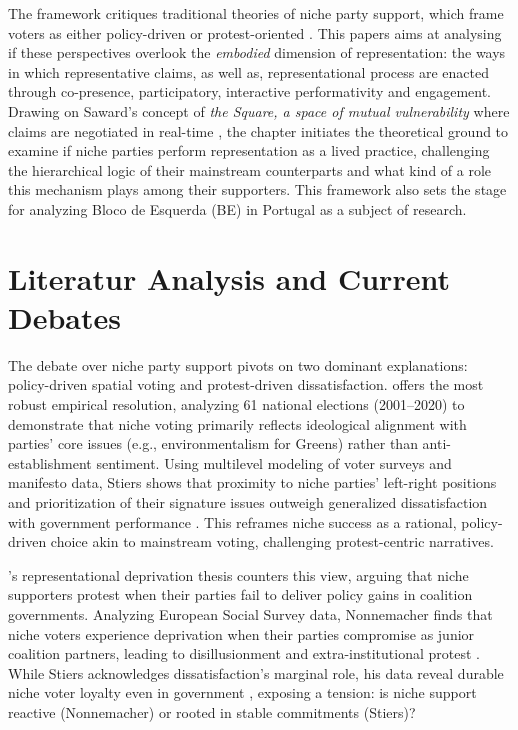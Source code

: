 The framework critiques traditional theories of niche party support, which frame voters as either policy-driven or protest-oriented \parencite{meguid2005, nonnemacher2023}. This papers aims at analysing if these perspectives overlook the \textit{embodied} dimension of representation: the ways in which representative claims, as well as, representational process are enacted through co-presence, participatory, interactive performativity and engagement. Drawing on Saward’s concept of \textit{the Square, a space of mutual vulnerability} where claims are negotiated in real-time \parencite[5]{saward2024}, the chapter initiates the theoretical ground to examine if niche parties perform representation as a lived practice, challenging the hierarchical logic of their mainstream counterparts and what kind of a role this mechanism plays among their supporters. This framework also sets the stage for analyzing Bloco de Esquerda (BE) in Portugal as a subject of research.

\section{Literatur Analysis and Current Debates}\label{sec:Literatur Analysis and Current Debates} %
The debate over niche party support pivots on two dominant explanations: policy-driven spatial voting and protest-driven dissatisfaction. \textcite{stiers2024} offers the most robust empirical resolution, analyzing 61 national elections (2001–2020) to demonstrate that niche voting primarily reflects ideological alignment with parties' core issues (e.g., environmentalism for Greens) rather than anti-establishment sentiment. Using multilevel modeling of voter surveys and manifesto data, Stiers shows that proximity to niche parties' left-right positions and prioritization of their signature issues outweigh generalized dissatisfaction with government performance \parencite[5-6]{stiers2024}. This reframes niche success as a rational, policy-driven choice akin to mainstream voting, challenging protest-centric narratives.

\textcite{nonnemacher2023}'s representational deprivation thesis counters this view, arguing that niche supporters protest when their parties fail to deliver policy gains in coalition governments. Analyzing European Social Survey data, Nonnemacher finds that niche voters experience deprivation when their parties compromise as junior coalition partners, leading to disillusionment and extra-institutional protest \parencite[31]{nonnemacher2023}. While Stiers acknowledges dissatisfaction’s marginal role, his data reveal durable niche voter loyalty even in government \parencite[10]{stiers2024}, exposing a tension: is niche support reactive (Nonnemacher) or rooted in stable commitments (Stiers)?

